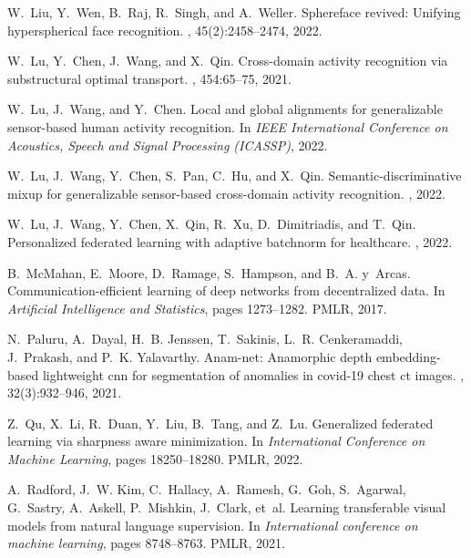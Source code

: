 \documentclass[11pt]{article}
\begin{document}
\begin{thebibliography}{10}
W.~Liu, Y.~Wen, B.~Raj, R.~Singh, and A.~Weller.
\newblock Sphereface revived: Unifying hyperspherical face recognition.
,
  45(2):2458--2474, 2022.

W.~Lu, Y.~Chen, J.~Wang, and X.~Qin.
\newblock Cross-domain activity recognition via substructural optimal
  transport.
, 454:65--75, 2021.

W.~Lu, J.~Wang, and Y.~Chen.
\newblock Local and global alignments for generalizable sensor-based human
  activity recognition.
\newblock In {\em IEEE International Conference on Acoustics, Speech and Signal
  Processing (ICASSP)}, 2022.

W.~Lu, J.~Wang, Y.~Chen, S.~Pan, C.~Hu, and X.~Qin.
\newblock Semantic-discriminative mixup for generalizable sensor-based
  cross-domain activity recognition.
, 2022.

W.~Lu, J.~Wang, Y.~Chen, X.~Qin, R.~Xu, D.~Dimitriadis, and T.~Qin.
\newblock Personalized federated learning with adaptive batchnorm for
  healthcare.
, 2022.

B.~McMahan, E.~Moore, D.~Ramage, S.~Hampson, and B.~A. y~Arcas.
\newblock Communication-efficient learning of deep networks from decentralized
  data.
\newblock In {\em Artificial Intelligence and Statistics}, pages 1273--1282.
  PMLR, 2017.

N.~Paluru, A.~Dayal, H.~B. Jenssen, T.~Sakinis, L.~R. Cenkeramaddi, J.~Prakash,
  and P.~K. Yalavarthy.
\newblock Anam-net: Anamorphic depth embedding-based lightweight cnn for
  segmentation of anomalies in covid-19 chest ct images.
,
  32(3):932--946, 2021.

Z.~Qu, X.~Li, R.~Duan, Y.~Liu, B.~Tang, and Z.~Lu.
\newblock Generalized federated learning via sharpness aware minimization.
\newblock In {\em International Conference on Machine Learning}, pages
  18250--18280. PMLR, 2022.

A.~Radford, J.~W. Kim, C.~Hallacy, A.~Ramesh, G.~Goh, S.~Agarwal, G.~Sastry,
  A.~Askell, P.~Mishkin, J.~Clark, et~al.
\newblock Learning transferable visual models from natural language
  supervision.
\newblock In {\em International conference on machine learning}, pages
  8748--8763. PMLR, 2021.


\end{thebibliography}
\end{document}
